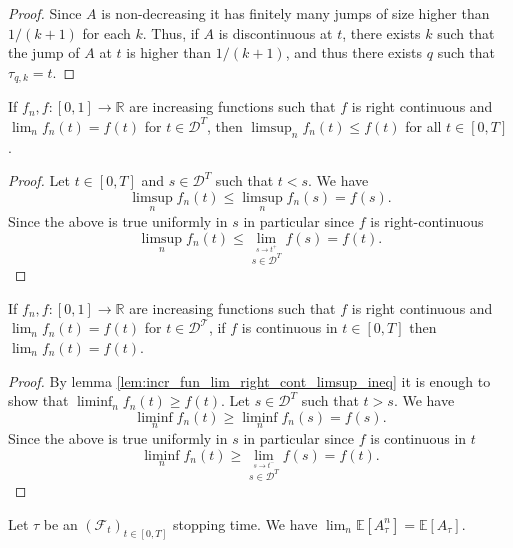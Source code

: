 \begin{proof}
Since $A$ is non-decreasing it has finitely many jumps of size higher than $1/(k+1)$ for each $k$.
Thus, if $A$ is discontinuous at $t$, there exists $k$ such that the jump of $A$ at $t$ is higher than $1/(k+1)$, and thus there exists $q$ such that $\tau_{q, k} = t$.
\end{proof}


\begin{lemma}\label{lem:incr_fun_lim_right_cont_limsup_ineq}
  If $f_n, f : [0, 1] \rightarrow \mathbb{R}$ are increasing functions such that $f$ is right continuous and
  $\lim_n f_n(t) = f (t)$ for $t \in\mathcal{D}^T$, then  $\limsup_n  f_n(t) \leq f (t)$ for all $t \in [0, T]$.
\end{lemma}

\begin{proof}
  Let $t\in[0,T]$ and $s\in\mathcal{D}^T$ such that $t<s$. We have
  $$
  \limsup_n f_n(t)\leq \limsup_n f_n(s)=f(s).
  $$
  Since the above is true uniformly in $s$ in particular since $f$ is right-continuous
  $$
  \limsup_n f_n(t)\leq\lim_{\stackrel{s\rightarrow t^+}{s\in\mathcal{D}^T}}f(s)=f(t).
  $$
\end{proof}


\begin{lemma}\label{lem:incr_fun_lim_right_cont_lim_eq}
  If $f_n, f : [0, 1] \rightarrow \mathbb{R}$ are increasing functions such that $f$ is right continuous and
  $\lim_n f_n(t) = f (t)$ for $t \in\mathcal{D^T}$, if $f$ is continuous in $t\in[0,T]$ then $\lim_n  f_n(t) = f (t)$.
\end{lemma}

\begin{proof}
  By lemma \ref{lem:incr_fun_lim_right_cont_limsup_ineq} it is enough to show that $\liminf_n f_n(t)\geq f(t)$.
  Let $s\in\mathcal{D}^T$ such that $t>s$. We have
  $$
  \liminf_n f_n(t)\geq \liminf_n f_n(s)=f(s).
  $$
  Since the above is true uniformly in $s$ in particular since $f$ is continuous in $t$
  $$
  \liminf_n f_n(t)\geq\lim_{\stackrel{s\rightarrow t^-}{s\in\mathcal{D}^T}}f(s)=f(t).
$$
\end{proof}


\begin{lemma}\label{lem:lim_Exp_A_n_tau_is_Exp_A_tau}
  Let $\tau$ be an $(\mathcal{F}_t)_{t\in[0,T]}$ stopping time. We have $\lim_n\mathbb{E}[A^n_\tau]=\mathbb{E}[A_\tau]$.
\end{lemma}

